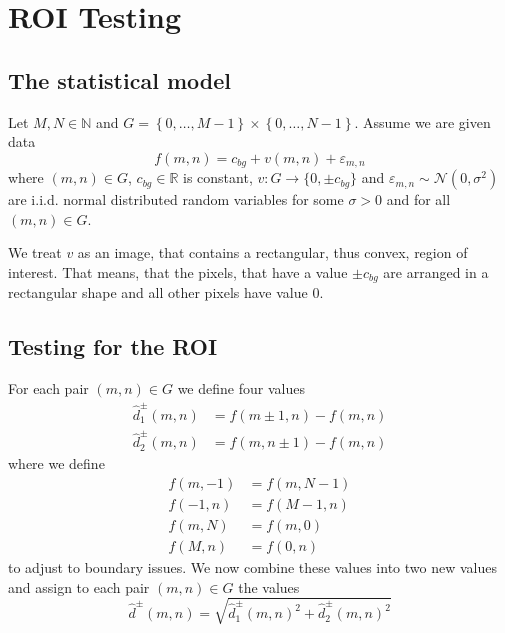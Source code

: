 \documentclass[a4paper,12pt]{article}
\theoremstyle{plain}
\theoremstyle{definition}
\theoremstyle{remark}
\begin{document}
\tableofcontents

\newpage

\section{ROI Testing}

\subsection{The statistical model}

Let $M, N \in \mathbb{N}$ and $G = \left\{ 0, \dots, M-1 \right\} \times  \left\{ 0, \dots, N-1 \right\}$. Assume we are given data
\begin{equation}\label{f}
	f(m, n) = c_{bg} + v(m, n) + \varepsilon_{m, n}
\end{equation}
where $(m, n) \in G$, $c_{bg} \in \mathbb{R}$ is constant, $v: G \to \{ 0, \pm c_{bg} \}$ and $\varepsilon_{m, n} \sim \mathcal{N}(0, \sigma^2)$ are i.i.d. normal distributed random variables for some $\sigma > 0$ and for all $(m, n) \in G$.

We treat $v$ as an image, that contains a rectangular, thus convex, region of interest. That means, that the pixels, that have a value $\pm c_{bg}$ are arranged in a rectangular shape and all other pixels have value $0$.

\subsection{Testing for the ROI}

For each pair $(m, n) \in G$ we define four values
\begin{align}
	\hat{d}^\pm_1(m, n) &= f(m \pm 1, n) - f(m, n) \label{d1} \\
	\hat{d}^\pm_2(m, n) &= f(m, n \pm 1) - f(m, n) \label{d2}
\end{align}
where we define
\begin{align*}
	f(m, -1) &= f(m, N-1) \\
	f(-1, n) &= f(M-1, n) \\
	f(m, N) &= f(m, 0) \\
	f(M, n) &= f(0, n)
\end{align*}
to adjust to boundary issues. We now combine these values into two new values and assign to each pair $(m, n) \in G$ the values
\begin{equation}\label{d_hat}
	\hat{d}^\pm(m, n) = \sqrt{\hat{d}^\pm_1(m, n)^2 + \hat{d}^\pm_2(m, n)^2}
\end{equation}
\end{document}
